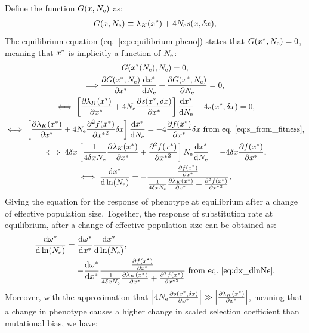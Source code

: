 \documentclass{article}
\begin{document}
Define the function $G(x, N_{\text{e}} )$ as:
\begin{gather}
    G(x, N_{\text{e}} ) \equiv \lambda_K (x^{*}) + 4 N_{\text{e}} s(x, \delta x),
\end{gather}
The equilibrium equation (eq.~\ref{eq:equilibrium-pheno}) states that $G(x^{*}, N_{\text{e}} )=0$, meaning that $x^{*}$ is implicitly a function of $N_{\text{e}}$:
\begin{gather}
    G(x^{*}(N_{\text{e}}), N_{\text{e}} ) = 0, \\
    \Longrightarrow \frac{\partial G(x^{*}, N_{\text{e}} ) }{\partial x^{*} }\frac{ \mathrm{d} x^{*}}{\mathrm{d} N_{\text{e}}} + \frac{ \partial G(x^{*}, N_{\text{e}} )}{\partial N_{\text{e}}} = 0, \\
    \iff \left[  \frac{\partial \lambda_K (x^{*}) }{\partial x^{*} }  + 4 N_{\text{e}} \frac{ \partial s(x^{*}, \delta x) }{\partial x^{*} } \right]\frac{ \mathrm{d} x^{*}}{\mathrm{d} N_{\text{e}}} + 4 s(x^{*}, \delta x) = 0, \\
    \iff \left[  \frac{\partial \lambda_K (x^{*}) }{\partial x^{*} } + 4 N_{\text{e}} \frac{ \partial^2 f (x^{*}) }{\partial {x^{*}}^2}\delta x \right]\frac{ \mathrm{d} x^{*}}{\mathrm{d} N_{\text{e}}}  = - 4 \frac{ \partial f (x^{*}) }{\partial {x^{*}}}\delta x \text{ from eq.~\ref{eq:s_from_fitness}}, \\
    \iff 4 \delta x \left[ \frac{1}{4 \delta x N_{\text{e}} } \frac{\partial \lambda_K (x^{*}) }{\partial x^{*} } + \frac{ \partial^2 f (x^{*}) }{\partial {x^{*}}^2} \right] N_{\text{e}} \frac{ \mathrm{d} x^{*}}{\mathrm{d} N_{\text{e}}}  = - 4 \delta x \frac{ \partial f (x^{*}) }{\partial {x^{*}}}, \\
    \iff \frac{ \mathrm{d} x^{*}}{\mathrm{d} \ln (N_{\text{e}})}  = - \frac{\frac{ \partial f (x^{*}) }{\partial {x^{*}}}}{\frac{1}{4 \delta x N_{\text{e}}} \frac{\partial \lambda_K (x^{*}) }{\partial x^{*} } + \frac{ \partial^2 f (x^{*}) }{\partial {x^{*}}^2}}  \label{eq:dx_dlnNe}.
\end{gather}
Giving the equation for the response of {phenotype} at equilibrium after a change of {effective population size}.
Together, the response of {substitution} rate at equilibrium, after a change of {effective population size} can be obtained as:
\begin{align}
    \frac{\mathrm{d} \omega^{*}}{\mathrm{d} \ln (N_{\text{e}})} & = \frac{\mathrm{d} \omega^{*}}{\mathrm{d} x^{*}} \frac{ \mathrm{d} x^{*}}{\mathrm{d} \ln (N_{\text{e}})}, \\
    &= - \frac{\mathrm{d} \omega^{*}}{\mathrm{d} x^{*}} \frac{\frac{ \partial f (x^{*}) }{\partial {x^{*}}}}{\frac{1}{4 \delta x N_{\text{e}} } \frac{\partial \lambda_K (x^{*}) }{\partial x^{*} } + \frac{ \partial^2 f (x^{*}) }{\partial {x^{*}}^2}} \text{ from eq.~\ref{eq:dx_dlnNe}} \label{eq:dw_dlnNe}.
\end{align}
Moreover, with the approximation that $\left| 4 N_{\text{e}} \frac{ \partial s(x^{*}, \delta x) }{\partial x^{*} } \right| \gg \left| \frac{\partial \lambda_K (x^{*}) }{\partial x^{*} } \right|$, meaning that a change in {phenotype} causes a higher change in scaled selection coefficient than mutational bias, we have:
\end{document}
